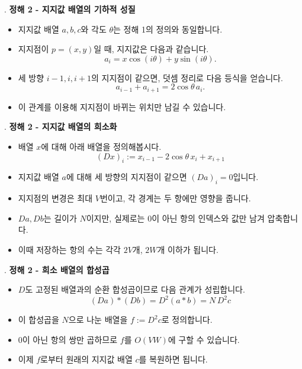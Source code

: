 \begin{frame}{\textbf{\pletter}. \ptitle}
    \textbf{정해 2 - 지지값 배열의 기하적 성질}
    \begin{itemize}
        \item 지지값 배열 $a,b,c$와 각도 $\theta$는 정해 1의 정의와 동일합니다.
        \item 지지점이 $p=(x,y)$일 때, 지지값은 다음과 같습니다.
        \[
            a_i=x\cos(i\theta)+y\sin(i\theta).
        \]
        \item 세 방향 $i-1,i,i+1$의 지지점이 같으면, 덧셈 정리로 다음 등식을 얻습니다.
        \[
            a_{i-1}+a_{i+1}=2\cos\theta\,a_i.
        \]
        \item 이 관계를 이용해 지지점이 바뀌는 위치만 남길 수 있습니다.
    \end{itemize}
\end{frame}

\begin{frame}{\textbf{\pletter}. \ptitle}
    \textbf{정해 2 - 지지값 배열의 희소화}
    
    \begin{itemize}
        \item 배열 $x$에 대해 아래 배열을 정의해봅시다. 
        \[
        (Dx)_i:=x_{i-1}-2\cos\theta\,x_i+x_{i+1}
    \]
        \item 지지값 배열 $a$에 대해 세 방향의 지지점이 같으면 $(Da)_i=0$입니다.
        \item 지지점의 변경은 최대 $V$번이고, 각 경계는 두 항에만 영향을 줍니다.
        \item $Da,Db$는 길이가 $N$이지만, 실제로는 $0$이 아닌 항의 인덱스와 값만 남겨 압축합니다.
        \item 이때 저장하는 항의 수는 각각 $2V$개, $2W$개 이하가 됩니다. 
    \end{itemize}
\end{frame}

\begin{frame}{\textbf{\pletter}. \ptitle}
    \textbf{정해 2 - 희소 배열의 합성곱}
    \begin{itemize}
        \item $D$도 고정된 배열과의 순환 합성곱이므로 다음 관계가 성립합니다.
        \[
            \boxed{(Da)*(Db)=D^2(a*b)=N\,D^2c}
        \]
        \item 이 합성곱을 $N$으로 나눈 배열을 $f:=D^2c$로 정의합니다.
        \item $0$이 아닌 항의 쌍만 곱하므로 $f$를 $O(VW)$에 구할 수 있습니다.
        \item 이제 $f$로부터 원래의 지지값 배열 $c$를 복원하면 됩니다.
    \end{itemize}
\end{frame}

